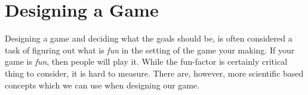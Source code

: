 \section{Designing a Game}
Designing a game and deciding what the goals should be, is often considered a task of figuring out what is \emph{fun} in the setting of the game your making. 
If your game is \emph{fun}, then people will play it. 
While the fun-factor is certainly critical thing to consider, it is hard to measure.
There are, however, more scientific based concepts which we can use when designing our game.


